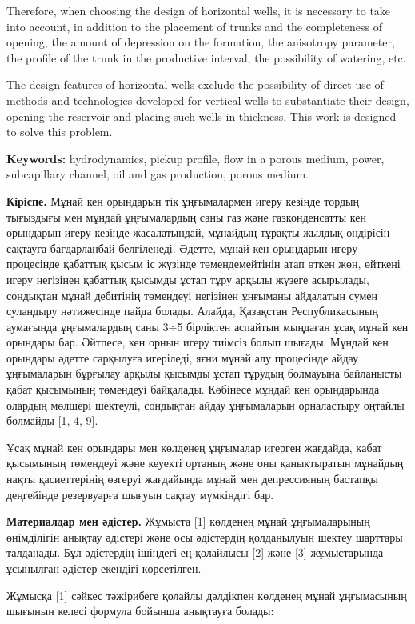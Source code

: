 Therefore, when choosing the design of horizontal wells, it is necessary
to take into account, in addition to the placement of trunks and the
completeness of opening, the amount of depression on the formation, the
anisotropy parameter, the profile of the trunk in the productive
interval, the possibility of watering, etc.

The design features of horizontal wells exclude the possibility of
direct use of methods and technologies developed for vertical wells to
substantiate their design, opening the reservoir and placing such wells
in thickness. This work is designed to solve this problem.

{\bfseries Keywords:} hydrodynamics, pickup profile, flow in a porous
medium, power, subcapillary channel, oil and gas production, porous
medium.
\begin{multicols}{2}

{\bfseries Кіріспе.} Мұнай кен орындарын тік ұңғымалармен игеру кезінде
тордың тығыздығы мен мұндай ұңғымалардың саны газ және газконденсатты
кен орындарын игеру кезінде жасалатындай, мұнайдың тұрақты жылдық
өндірісін сақтауға бағдарланбай белгіленеді. Әдетте, мұнай кен орындарын
игеру процесінде қабаттық қысым іс жүзінде төмендемейтінін атап өткен
жөн, өйткені игеру негізінен қабаттық қысымды ұстап тұру арқылы жүзеге
асырылады, сондықтан мұнай дебитінің төмендеуі негізінен ұңғыманы
айдалатын сумен суландыру нәтижесінде пайда болады. Алайда, Қазақстан
Республикасының аумағында ұңғымалардың саны 3÷5 бірліктен аспайтын
мыңдаған ұсақ мұнай кен орындары бар. Әйтпесе, кен орнын игеру тиімсіз
болып шығады. Мұндай кен орындары әдетте сарқылуға игеріледі, яғни мұнай
алу процесінде айдау ұңғымаларын бұрғылау арқылы қысымды ұстап тұрудың
болмауына байланысты қабат қысымының төмендеуі байқалады. Көбінесе
мұндай кен орындарында олардың мөлшері шектеулі, сондықтан айдау
ұңғымаларын орналастыру оңтайлы болмайды {[}1, 4, 9{]}.

Ұсақ мұнай кен орындары мен көлденең ұңғымалар игерген жағдайда, қабат
қысымының төмендеуі және кеуекті ортаның және оны қанықтыратын мұнайдың
нақты қасиеттерінің өзгеруі жағдайында мұнай мен депрессияның бастапқы
деңгейінде резервуарға шығуын сақтау мүмкіндігі бар.

{\bfseries Материалдар мен әдістер.} Жұмыста {[}1{]} көлденең мұнай
ұңғымаларының өнімділігін анықтау әдістері және осы әдістердің
қолданылуын шектеу шарттары талданады. Бұл әдістердің ішіндегі ең
қолайлысы {[}2{]} және {[}3{]} жұмыстарында ұсынылған әдістер екендігі
көрсетілген.

Жұмысқа {[}1{]} сәйкес тәжірибеге қолайлы дәлдікпен көлденең мұнай
ұңғымасының шығынын келесі формула бойынша анықтауға болады:
\end{multicols}

